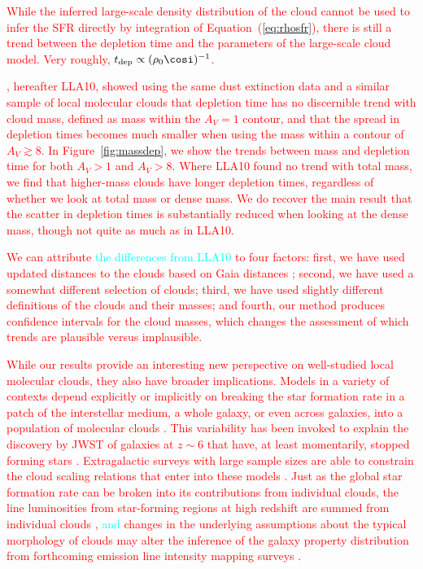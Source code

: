 \documentclass[twocolumn]{aastex631}
\begin{document}
{\textcolor{red}{While the inferred large-scale density distribution of the cloud cannot be used to
infer the SFR directly by integration of Equation~(\ref{eq:rhosfr}), there is still
a trend between the depletion time and the parameters of the large-scale cloud
model. Very roughly, $t_{\mathrm{dep}} \propto (\rho_0\cosi)^{-1}$.}

\textcolor{red}{\citet{Lada2010}, hereafter LLA10, showed using the same dust extinction data and
a similar sample of local molecular clouds that depletion time has no discernible
trend with cloud mass, defined as mass within the $A_V = 1$ contour, and that the
spread in depletion times becomes much smaller when using the mass within a contour
of $A_V \gtrsim 8$. In Figure~\ref{fig:massdep}, we show the trends between mass and
depletion time for both $A_V > 1$ and $A_V > 8$. Where LLA10 found no trend with
total mass, we find that higher-mass clouds have longer depletion times, regardless
of whether we look at total mass or dense mass. We do recover the main result that
the scatter in depletion times is substantially reduced when looking at the dense
mass, though not quite as much as in LLA10.}

\textcolor{red}{We can attribute \textcolor{cyan}{the differences from LLA10} to four factors: first, we have used
updated distances to the clouds based on Gaia distances \citep{Zucker2020};
second, we have used a somewhat different selection of clouds; third, we have used
slightly different definitions of the clouds and their masses; and fourth, our
method produces confidence intervals for the cloud masses, which changes the
assessment of which trends are plausible versus implausible.}

\textcolor{red}{While our results provide an interesting new perspective on well-studied local molecular clouds, they also have broader implications. Models in a variety of contexts depend explicitly or implicitly on breaking the star formation rate in a
patch of the interstellar medium, a whole galaxy, or even across galaxies, into a population of molecular clouds \citep{Chevance2020, Tacchella2020}. This variability has been invoked to explain the discovery by JWST of galaxies at $z \sim 6$ that have, at least momentarily, stopped forming stars
\citep{Dome2023}. Extragalactic surveys with large sample sizes are able to constrain the cloud scaling relations that enter into these models
\citep[e.g.,][]{Hughes2013, Faesi2018, Rosolowsky2021}. Just as the global star formation rate can be broken into its contributions from individual clouds, the line luminosities from star-forming regions at high redshift are summed from individual clouds \citep{Krumholz2014, Narayanan2014, Narayanan2017}, \textcolor{cyan}{and} changes in the underlying assumptions about the typical morphology of clouds may alter the inference of the galaxy property distribution \citep{Zhang2023} from forthcoming emission line intensity mapping surveys \citep[e.g.,][]{Pullen2023}.}

}
\end{document}
